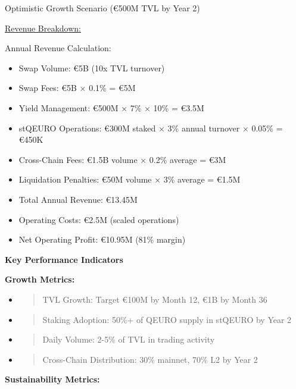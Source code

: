 Optimistic Growth Scenario (€500M TVL by Year 2)

\ul{Revenue Breakdown:}

Annual Revenue Calculation:

\begin{itemize}
\item
  Swap Volume: €5B (10x TVL turnover)
\item
  Swap Fees: €5B × 0.1\% = €5M
\item
  Yield Management: €500M × 7\% × 10\% = €3.5M
\item
  stQEURO Operations: €300M staked × 3\% annual turnover × 0.05\% =
  €450K
\item
  Cross-Chain Fees: €1.5B volume × 0.2\% average = €3M
\item
  Liquidation Penalties: €50M volume × 3\% average = €1.5M
\item
  Total Annual Revenue: €13.45M
\item
  Operating Costs: €2.5M (scaled operations)
\item
  Net Operating Profit: €10.95M (81\% margin)
\end{itemize}

\textbf{Key Performance Indicators}

\textbf{Growth Metrics:}

\begin{itemize}
\item
  \begin{quote}
  TVL Growth: Target €100M by Month 12, €1B by Month 36
  \end{quote}
\item
  \begin{quote}
  Staking Adoption: 50\%+ of QEURO supply in stQEURO by Year 2
  \end{quote}
\item
  \begin{quote}
  Daily Volume: 2-5\% of TVL in trading activity
  \end{quote}
\item
  \begin{quote}
  Cross-Chain Distribution: 30\% mainnet, 70\% L2 by Year 2
  \end{quote}
\end{itemize}

\textbf{Sustainability Metrics:}

